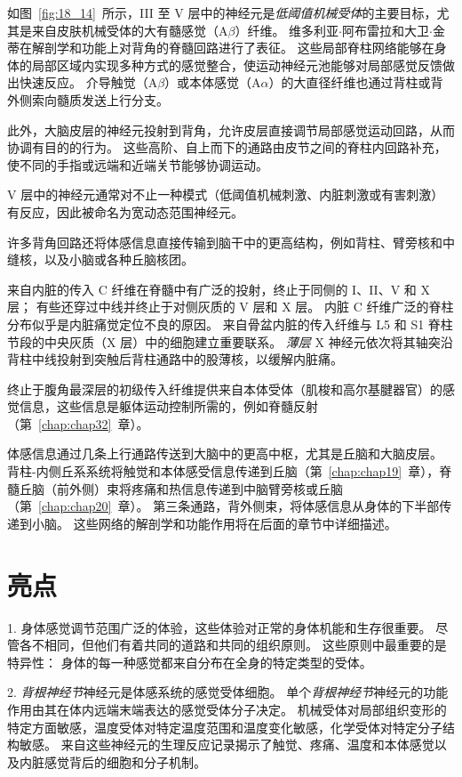 如图~\ref{fig:18_14}~所示，III 至 V 层中的神经元是\textit{低阈值机械受体}的主要目标，尤其是来自皮肤机械受体的大有髓感觉（A$\beta$）纤维。
维多利亚$\cdot$阿布雷拉和大卫$\cdot$金蒂在解剖学和功能上对背角的脊髓回路进行了表征。
这些局部脊柱网络能够在身体的局部区域内实现多种方式的感觉整合，使运动神经元池能够对局部感觉反馈做出快速反应。
介导触觉（A$\beta$）或本体感觉（A$\alpha$）的大直径纤维也通过背柱或背外侧索向髓质发送上行分支。


此外，大脑皮层的神经元投射到背角，允许皮层直接调节局部感觉运动回路，从而协调有目的的行为。
这些高阶、自上而下的通路由皮节之间的脊柱内回路补充，使不同的手指或远端和近端关节能够协调运动。


V 层中的神经元通常对不止一种模式（低阈值机械刺激、内脏刺激或有害刺激）有反应，因此被命名为宽动态范围神经元。


许多背角回路还将体感信息直接传输到脑干中的更高结构，例如背柱、臂旁核和中缝核，以及小脑或各种丘脑核团。


来自内脏的传入 C 纤维在脊髓中有广泛的投射，终止于同侧的 I、II、V 和 X 层；
有些还穿过中线并终止于对侧灰质的 V 层和 X 层。
内脏 C 纤维广泛的脊柱分布似乎是内脏痛觉定位不良的原因。 
来自骨盆内脏的传入纤维与 L5 和 S1 脊柱节段的中央灰质（X 层）中的细胞建立重要联系。 
\textit{薄层} X 神经元依次将其轴突沿背柱中线投射到突触后背柱通路中的股薄核，以缓解内脏痛。


终止于腹角最深层的初级传入纤维提供来自本体受体（肌梭和高尔基腱器官）的感觉信息，这些信息是躯体运动控制所需的，例如脊髓反射（第~\ref{chap:chap32}~章）。


体感信息通过几条上行通路传送到大脑中的更高中枢，尤其是丘脑和大脑皮层。
背柱-内侧丘系系统将触觉和本体感受信息传递到丘脑（第~\ref{chap:chap19}~章），脊髓丘脑（前外侧）束将疼痛和热信息传递到中脑臂旁核或丘脑（第~\ref{chap:chap20}~章）。
第三条通路，背外侧束，将体感信息从身体的下半部传递到小脑。
这些网络的解剖学和功能作用将在后面的章节中详细描述。




\section{亮点}


1. 身体感觉调节范围广泛的体验，这些体验对正常的身体机能和生存很重要。
尽管各不相同，但他们有着共同的道路和共同的组织原则。
这些原则中最重要的是特异性：
身体的每一种感觉都来自分布在全身的特定类型的受体。 


2. \textit{背根神经节}神经元是体感系统的感觉受体细胞。
单个\textit{背根神经节}神经元的功能作用由其在体内远端末端表达的感觉受体分子决定。
机械受体对局部组织变形的特定方面敏感，温度受体对特定温度范围和温度变化敏感，化学受体对特定分子结构敏感。
来自这些神经元的生理反应记录揭示了触觉、疼痛、温度和本体感觉以及内脏感觉背后的细胞和分子机制。 


